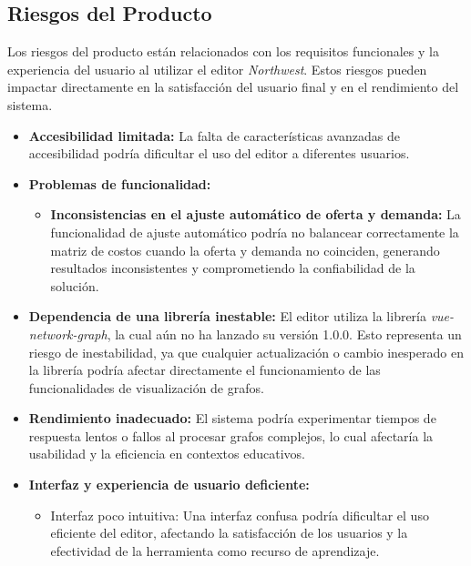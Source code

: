 \documentclass[stu, 12pt, letterpaper, donotrepeattitle, floatsintext, natbib]{apa7}
\begin{document}
\subsection{Riesgos del Producto}
Los riesgos del producto están relacionados con los requisitos funcionales y la experiencia del usuario al utilizar el editor \textit{Northwest}. Estos riesgos pueden impactar directamente en la satisfacción del usuario final y en el rendimiento del sistema.

\begin{itemize}
    \item \textbf{Accesibilidad limitada:} La falta de características avanzadas de accesibilidad podría dificultar el uso del editor a diferentes usuarios.

    \item \textbf{Problemas de funcionalidad:} 
    \begin{itemize}
        \item \textbf{Inconsistencias en el ajuste automático de oferta y demanda:} La funcionalidad de ajuste automático podría no balancear correctamente la matriz de costos cuando la oferta y demanda no coinciden, generando resultados inconsistentes y comprometiendo la confiabilidad de la solución.
    \end{itemize}
    
    \item \textbf{Dependencia de una librería inestable:} El editor utiliza la librería \textit{vue-network-graph}, la cual aún no ha lanzado su versión 1.0.0. Esto representa un riesgo de inestabilidad, ya que cualquier actualización o cambio inesperado en la librería podría afectar directamente el funcionamiento de las funcionalidades de visualización de grafos.

    \item \textbf{Rendimiento inadecuado:} El sistema podría experimentar tiempos de respuesta lentos o fallos al procesar grafos complejos, lo cual afectaría la usabilidad y la eficiencia en contextos educativos.

    \item \textbf{Interfaz y experiencia de usuario deficiente:} 
    \begin{itemize}
        \item Interfaz poco intuitiva: Una interfaz confusa podría dificultar el uso eficiente del editor, afectando la satisfacción de los usuarios y la efectividad de la herramienta como recurso de aprendizaje.
    \end{itemize}
\end{itemize}
\end{document}
